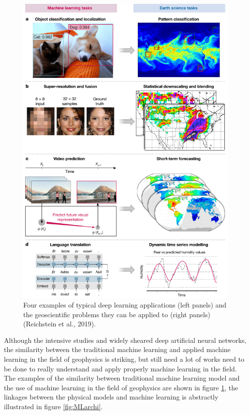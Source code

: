 \begin{figure}
    \centering
    \includegraphics[scale=0.6]{images/MLapp.png}
    \caption{Four examples of typical deep learning applications (left panels) and the geoscientific problems they can be applied to (right panels) (Reichstein et al., 2019).}
    \label{fig:MLapp}
\end{figure}

Although the intensive studies and widely sheared deep artificial neural networks, the similarity between the traditional machine learning and applied machine learning in the field of geophysics is striking, but still need a lot of works need to be done to really understand and apply properly machine learning in the field. The examples of the similarity between traditional machine learning model and the use of machine learning in the field of geophysics are shown in figure \ref{fig:MLapp}, the linkages between the physical models and machine learning is abstractly illustrated in figure \ref{fig:MLarchi}.


